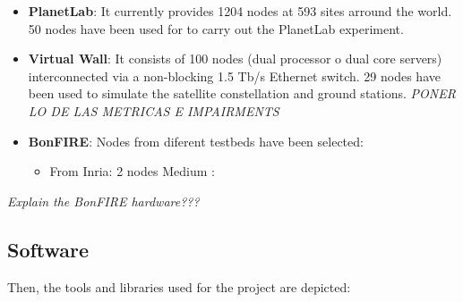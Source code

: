 \begin{itemize}
\item \textbf{PlanetLab}: It currently provides 1204 nodes at 593 sites arround
  the world. 50 nodes have been used for to carry out the PlanetLab experiment.

\item \textbf{Virtual Wall}: It consists of 100 nodes (dual processor o dual
  core servers) interconnected via a non-blocking 1.5 Tb/s Ethernet switch. 29
  nodes have been used to simulate the satellite constellation and ground
  stations. \emph{PONER LO DE LAS METRICAS E IMPAIRMENTS}

\item \textbf{BonFIRE}: Nodes from diferent testbeds have been selected:
  \begin{itemize}
    \item From Inria: 2 nodes Medium : 

\end{itemize}
\end{itemize}

\emph{Explain the BonFIRE hardware???}

\subsection{Software}

Then, the tools and libraries used for the project are depicted:

